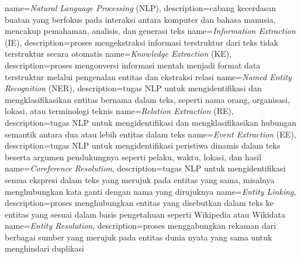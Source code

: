 {
	name={\textit{Natural Language Processing} (NLP)},
	description={cabang kecerdasan buatan yang berfokus pada interaksi antara komputer dan bahasa manusia, mencakup pemahaman, analisis, dan generasi teks}
}
{
	name={\textit{Information Extraction} (IE)},
	description={proses mengekstraksi informasi terstruktur dari teks tidak terstruktur secara otomatis}
}
{
	name={\textit{Knowledge Extraction} (KE)},
	description={proses mengonversi informasi mentah menjadi format data terstruktur melalui pengenalan entitas dan ekstraksi relasi}
}
{
	name={\textit{Named Entity Recognition} (NER)},
	description={tugas NLP untuk mengidentifikasi dan mengklasifikasikan entitas bernama dalam teks, seperti nama orang, organisasi, lokasi, atau terminologi teknis}
}
{
	name={\textit{Relation Extraction} (RE)},
	description={tugas NLP untuk mengidentifikasi dan mengklasifikasikan hubungan semantik antara dua atau lebih entitas dalam teks}
}
{
	name={\textit{Event Extraction} (EE)},
	description={tugas NLP untuk mengidentifikasi peristiwa dinamis dalam teks beserta argumen pendukungnya seperti pelaku, waktu, lokasi, dan hasil}
}
{
	name={\textit{Coreference Resolution}},
	description={tugas NLP untuk mengidentifikasi semua ekspresi dalam teks yang merujuk pada entitas yang sama, misalnya menghubungkan kata ganti dengan nama yang dirujuknya}
}
{
	name={\textit{Entity Linking}},
	description={proses menghubungkan entitas yang disebutkan dalam teks ke entitas yang sesuai dalam basis pengetahuan seperti Wikipedia atau Wikidata}
}
{
	name={\textit{Entity Resolution}},
	description={proses menggabungkan rekaman dari berbagai sumber yang merujuk pada entitas dunia nyata yang sama untuk menghindari duplikasi}
}


